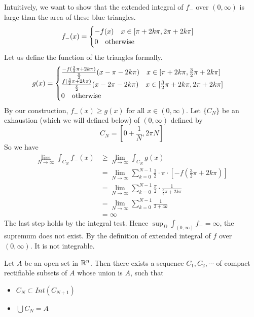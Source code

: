 \begin{itemize}
    Intuitively, we want to show that the extended integral of $f_-$ over $(0,\infty)$ is large than the area of these blue triangles.
    \begin{equation}
        f_-(x)=\begin{cases}
            -f(x)\text{\quad }x\in[\pi+2k\pi,2\pi+2k\pi]\\
            0 \text{\quad otherwise}
        \end{cases}
    \end{equation}
    Let us define the function of the triangles formally.
    \begin{equation}
        g(x)=\begin{cases}
            \frac{-f(\frac{3}{2}\pi+2k\pi)}{\frac{\pi}{2}}(x-\pi-2k\pi)\text{\quad}x\in[\pi+2k\pi,\frac{3}{2}\pi+2k\pi]\\
            \frac{f(\frac{3}{2}\pi+2k\pi)}{\frac{\pi}{2}}(x-2\pi-2k\pi)\text{\quad}x\in[\frac{3}{2}\pi+2k\pi,2\pi+2k\pi]\\
            0 \text{\quad otherwise}
        \end{cases}
    \end{equation}
    By our construction, $f_-(x)\geq g(x)$ for all $x\in (0,\infty)$. Let $\{C_N\}$ be an exhaustion (which we will defined below) of $(0,\infty)$ defined by $$C_N=[0+\frac{1}{N},2\pi N]$$
    So we have
    \begin{equation}
        \begin{split}
            \lim_{N\to \infty}\int_{C_N}f_-(x) &\geq \lim_{N\to \infty}\int_{C_N}g(x)\\
            &= \lim_{N\to \infty}\sum_{k=0}^{N-1}\frac{1}{2}\cdot \pi\cdot [-f(\frac{3}{2}\pi+2k\pi)]\\
            &= \lim_{N\to \infty}\sum_{k=0}^{N-1}\frac{\pi}{2}\cdot\frac{1}{\frac{3}{2}\pi+2k\pi}\\
            &= \lim_{N\to \infty}\sum_{k=0}^{N-1}\frac{1}{3+4k}\\
            &= \infty
        \end{split}
    \end{equation}
    The last step holds by the integral test. Hence $\sup_D\int_{(0,\infty)}f_-=\infty$, the supremum does not exist. 
    By the definition of extended integral of $f$ over $(0,\infty)$. It is not integrable.
\end{itemize}

\begin{theorem}\label{exhaustion}
    Let $A$ be an open set in $\mathbb{R}^n$. Then there exists a sequence $C_1,C_2,\cdots$ of compact rectifiable subsets of $A$ whose union is $A$, such that 
    \begin{itemize}
        \item $C_N\subset Int(C_{N+1})$
        \item $\bigcup C_N=A$
    \end{itemize}
\end{theorem}


